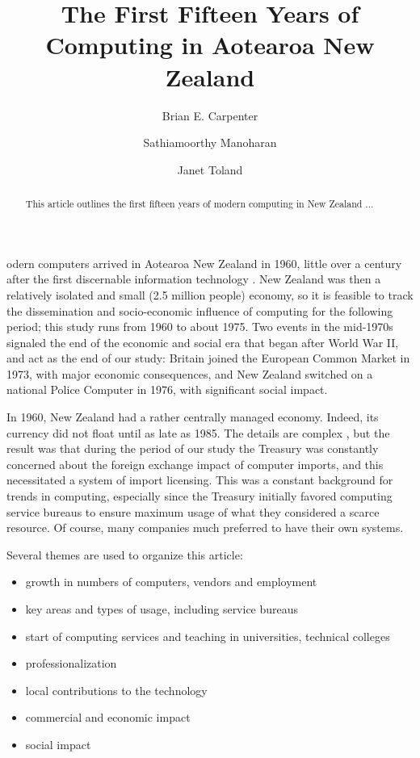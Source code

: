 \documentclass{IEEEcsmag}
\begin{document}

\title{The First Fifteen Years of Computing in Aotearoa New Zealand}

\author{Brian E. Carpenter}

\author{Sathiamoorthy Manoharan}

\author{Janet Toland}



\begin{abstract}This article outlines the first fifteen years of modern computing in New Zealand ... 
\end{abstract}

\maketitle


odern computers arrived in Aotearoa New Zealand in 1960, little over a century after the first discernable information technology \cite{pioneers}. New Zealand was then a relatively isolated and small (2.5 million people) economy, so it is feasible to track the dissemination and socio-economic influence of computing for the following period; this study runs from 1960 to about 1975. Two events in the mid-1970s signaled the end of the economic and social era that began after World War II, and act as the end of our study: Britain joined the European Common Market in 1973, with major economic consequences, and New Zealand switched on a national Police Computer in 1976, with significant social impact.

In 1960, New Zealand had a rather centrally managed economy. Indeed, its currency did not float until as late as 1985. The details are complex \cite{Sullivan2013}, but the result was that during the period of our study the Treasury was constantly concerned about the foreign exchange impact of computer imports, and this necessitated a system of import licensing. This was a constant background for trends in computing, especially since the Treasury initially favored computing service bureaus to ensure maximum usage of what they considered a scarce resource. Of course, many companies much preferred to have their own systems.

Several themes are used to organize this article:

\begin{itemize}
\item growth in numbers of computers, vendors and employment
\item key areas  and types of usage, including service bureaus
\item start of computing services and teaching in universities, technical colleges
\item professionalization
\item local contributions to the technology
\item commercial and economic impact
\item social impact
\end{itemize}
\end{document}
